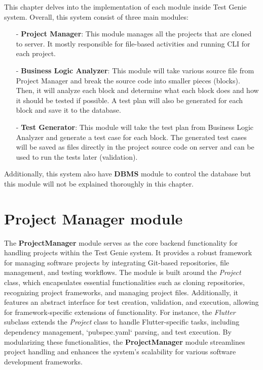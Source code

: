 This chapter delves into the implementation of each module inside Test Genie system. Overall, this system consist of three main modules: 
\begin{itemize}
    \item[-] \textbf{Project Manager}: This module manages all the projects that are cloned to server. It mostly responsible for file-based activities and running CLI for each project.
    \item[-] \textbf{Business Logic Analyzer}: This module will take various source file from Project Manager and break the source code into smaller pieces (blocks). Then, it will analyze each block and determine what each block does and how it should be tested if possible. A test plan will also be generated for each block and save it to the database.
    \item[-] \textbf{Test Generator}: This module will take the test plan from Business Logic Analyzer and generate a test case for each block. The generated test cases will be saved as files directly in the project source code on server and can be used to run the tests later (validation).
\end{itemize}
Additionally, this system also have \textbf{DBMS} module to control the database but this module will not be explained thoroughly in this chapter.


\section{Project Manager module}

The \textbf{ProjectManager} module serves as the core backend functionality for handling projects within the Test Genie system. It provides a robust framework for managing software projects by integrating Git-based repositories, file management, and testing workflows. The module is built around the \textit{Project} class, which encapsulates essential functionalities such as cloning repositories, recognizing project frameworks, and managing project files. Additionally, it features an abstract interface for test creation, validation, and execution, allowing for framework-specific extensions of functionality. For instance, the \textit{Flutter} subclass extends the \textit{Project} class to handle Flutter-specific tasks, including dependency management, `pubspec.yaml` parsing, and test execution. By modularizing these functionalities, the \textbf{ProjectManager} module streamlines project handling and enhances the system's scalability for various software development frameworks.

